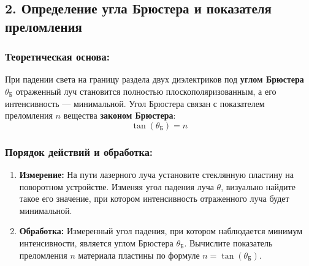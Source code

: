 \subsection*{2. Определение угла Брюстера и показателя преломления}

\subsubsection*{Теоретическая основа:}
При падении света на границу раздела двух диэлектриков под \textbf{углом Брюстера} $\theta_Б$ отраженный луч становится полностью плоскополяризованным, а его интенсивность --- минимальной. Угол Брюстера связан с показателем преломления $n$ вещества \textbf{законом Брюстера}:
\[ \tan(\theta_\text{Б}) = n \]

\subsubsection*{Порядок действий и обработка:}
\begin{enumerate}
    \item \textbf{Измерение:} На пути лазерного луча установите стеклянную пластину на поворотном устройстве. Изменяя угол падения луча $\theta$, визуально найдите такое его значение, при котором интенсивность отраженного луча будет минимальной.
    
    \item \textbf{Обработка:} Измеренный угол падения, при котором наблюдается минимум интенсивности, является углом Брюстера $\theta_\text{Б}$. Вычислите показатель преломления $n$ материала пластины по формуле $n = \tan(\theta_\text{Б})$.
\end{enumerate}



















\newpage
{}

